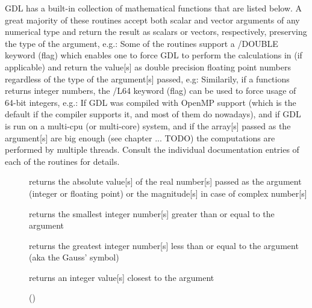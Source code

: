 GDL has a built-in collection of mathematical functions that are listed below.
A great majority of these routines accept both scalar and vector arguments of any
  numerical type and return the result as scalars or vectors, respectively,
  preserving the type of the argument, e.g.:
Some of the routines support a /DOUBLE keyword (flag) which enables one
  to force GDL to perform the calculations in (if applicable) and return the value[s] 
  as double precision floating point numbers regardless of the type of the argument[s] passed, e.g:
Similarily, if a functions returns integer numbers, the /L64 keyword (flag)
  can be used to force usage of 64-bit integers, e.g.:
If GDL was compiled with OpenMP support (which is the default if the compiler supports it, and most
  of them do nowadays), and if GDL is run on a multi-cpu (or multi-core) system, and 
  if the array[s] passed as the argument[s] are big enough (see chapter ... TODO) the computations
  are performed by multiple threads.
Consult the individual documentation entries of each of the routines for details.

\begin{description}
  \item[]{returns the absolute value[s] of the real number[s] passed as the argument 
    (integer or floating point) or the magnitude[s] 
    in case of complex number[s]}
  \item[]{returns the smallest integer number[s] greater than or equal to the argument}
  \item[]{returns the greatest integer number[s] less than or equal to the argument (aka the Gauss' symbol)}
  \item[]{returns an integer value[s] closest to the argument}
\end{description}

\begin{description}
  \item[]{}
  \item[]{}
  \item[]{}
  \item[]{}
  \item[]{}
  \item[]{}
  \item[]{}
  \item[]{ ()}
\end{description}

